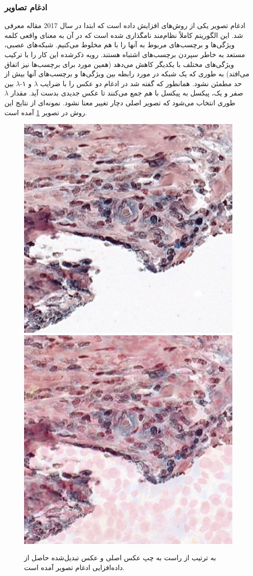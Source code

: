 \subsubsection{ادغام تصاویر}
ادغام تصویر یکی از روش‌های افزایش داده است که ابتدا در سال 2017 مقاله
\cite{zhang2017mixup}
معرفی شد.
این الگوریتم کاملاً نظام‌مند نامگذاری شده است که در آن به معنای واقعی کلمه ویژگی‌ها و برچسب‌های مربوط به آنها را با هم مخلوط می‌کنیم. شبکه‌های عصبی، مستعد به خاطر سپردن برچسب‌های اشتباه هستند. رویه ذکر‌شده این کار را با ترکیب ویژگی‌های مختلف با یکدیگر کاهش می‌دهد (همین مورد برای برچسب‌ها نیز اتفاق می‌افتد) به طوری که یک شبکه در مورد رابطه بین ویژگی‌ها و برچسب‌های آنها بیش از حد مطمئن نشود.
همانطور که گفته شد در ادغام دو عکس را با ضرایب $\lambda$ و ۱-$\lambda$ بین صفر و یک، پیکسل به پیکسل با هم جمع می‌کنند تا عکس جدیدی بدست آید. مقدار $\lambda$ طوری انتخاب می‌شود که تصویر اصلی دچار تغییر معنا نشود.
نمونه‌ای از نتایج این روش در تصویر \ref{mixup augmentation} آمده است.
\begin{figure}
    \begin{center}
        \includegraphics[width=0.48\linewidth]{figs/suggested_methods/subs/data_augmentation/mixup_776-original.jpeg}
        \includegraphics[width=0.48\linewidth]{figs/suggested_methods/subs/data_augmentation/mixup_776-transformed.jpeg}
    \end{center}
    \caption[نمونه‌ای از داده‌افزایی ادغام تصویر]{ به ترتیب از راست به چپ عکس اصلی و عکس تبدیل‌شده حاصل از داده‌افزایی ادغام تصویر آمده است.}
    \label{mixup augmentation}
\end{figure}
